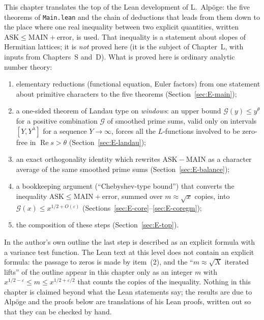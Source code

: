 This chapter translates the top of the Lean development of L.~Alp\"oge: the five theorems of
\texttt{Main.lean} and the chain of deductions that leads from them down to the place where one
real inequality between two explicit quantities, written
$\mathrm{ASK}\le \mathrm{MAIN}+\mathrm{error}$, is used. That inequality is a statement about
slopes of Hermitian lattices; it is \emph{not} proved here (it is the subject of Chapter~L, with
inputs from Chapters~S and~D). What is proved here is ordinary analytic number theory:
\begin{enumerate}
\item elementary reductions (functional equation, Euler factors) from one statement about
primitive characters to the five theorems (Section~\ref{sec:E-main});
\item a one-sided theorem of Landau type on \emph{windows}: an upper bound
$\mathcal G(y)\le y^{\theta}$ for a positive combination $\mathcal G$ of smoothed prime sums,
valid only on intervals $[Y,Y^{\lambda}]$ for a sequence $Y\to\infty$, forces all the
$L$-functions involved to be zero-free in $\operatorname{Re}s>\theta$ (Section~\ref{sec:E-landau});
\item an exact orthogonality identity which rewrites $\mathrm{ASK}-\mathrm{MAIN}$ as a character
average of the same smoothed prime sums (Section~\ref{sec:E-balance});
\item a bookkeeping argument (``Chebyshev-type bound'') that converts the inequality
$\mathrm{ASK}\le\mathrm{MAIN}+\mathrm{error}$, summed over $m\approx\sqrt x$ copies, into
$\mathcal G(x)\le x^{1/2+O(\varepsilon)}$ (Sections~\ref{sec:E-core}--\ref{sec:E-coregm});
\item the composition of these steps (Section~\ref{sec:E-top}).
\end{enumerate}
In the author's own outline the last step is described as an explicit formula with a variance test
function. The Lean text at this level does not contain an explicit formula: the passage to zeros
is made by item~(2), and the ``$m\approx\sqrt X$ iterated lifts'' of the outline appear in this
chapter only as an integer $m$ with $x^{1/2-\varepsilon}\le m\le x^{1/2+\varepsilon/2}$ that counts
the copies of the inequality. Nothing in this chapter is claimed beyond what the Lean statements
say; the results are due to Alp\"oge and the proofs below are translations of his Lean proofs,
written out so that they can be checked by hand.

